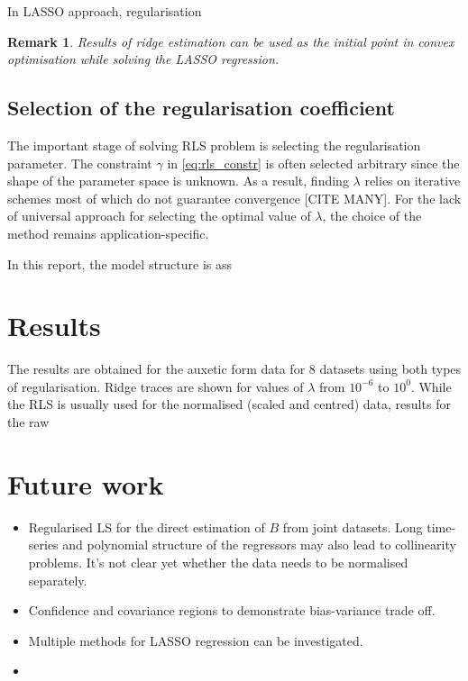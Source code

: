 \documentclass[a4paper,11pt,twoside]{article}
\theoremstyle{mytheoremstyle}
\newtheorem{remark}{Remark}[section]
\begin{document}
\par In LASSO approach, regularisation 

\begin{remark}
	Results of ridge estimation can be used as the initial point in convex optimisation while solving the LASSO regression. 
\end{remark}
\subsection{Selection of the regularisation coefficient}
\par The important stage of solving RLS problem is selecting the regularisation parameter. The constraint $\gamma$ in \eqref{eq:rls_constr} is often selected arbitrary since the shape of the parameter space is unknown. As a result, finding $\lambda$ relies on iterative schemes most of which do not guarantee convergence [CITE MANY]. For the lack of universal approach for selecting the optimal value of $\lambda$, the choice of the method remains application-specific.
\par In this report, the model structure is ass 
\section{Results}
\par The results are obtained for the auxetic form data for 8 datasets using both types of regularisation. Ridge traces are shown for values of $\lambda$ from $10^{-6}$ to $10^0$. While the RLS is usually used for the normalised (scaled and centred) data, results for the raw   

\section{Future work}
\begin{itemize}
	\item Regularised LS for the direct estimation of $B$ from joint datasets. Long time-series and polynomial structure of the regressors may also lead to collinearity problems. It's not clear yet whether the data needs to be normalised separately.
	\item Confidence and covariance regions to demonstrate bias-variance trade off.
	\item Multiple methods for LASSO regression can be investigated.
	\item 
\end{itemize}
\end{document}
